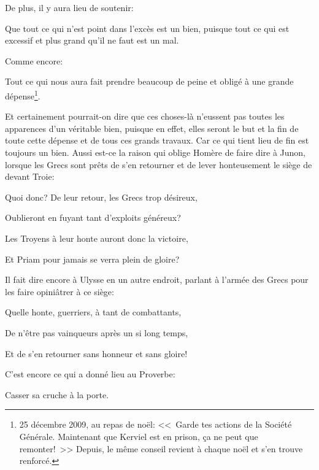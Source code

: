 \bigbreak

De plus, il y aura lieu de soutenir:

\begin{emphpar}
      Que tout ce qui n'est point dans l’excès est un bien, puisque tout ce qui est excessif et plus grand qu'il ne
	  faut est un mal.
\end{emphpar}

\bigbreak

Comme encore:

\begin{emphpar}
      Tout ce qui nous aura fait prendre beaucoup de peine et obligé à une grande dépense\footnote{25 décembre 2009,
	  au repas de noël: <<~Garde tes actions de la Société Générale. Maintenant que Kerviel est en prison, ça ne peut
	  que remonter!~>> Depuis, le même conseil revient à chaque noël et s'en trouve renforcé.}.
\end{emphpar}

Et certainement pourrait-on dire que ces choses-là n'eussent pas toutes les apparences d'un véritable bien, puisque en
effet, elles seront le but et la fin de toute cette dépense et de tous ces grands travaux. Car ce qui tient lieu de fin
est toujours un bien. Aussi est-ce la raison qui oblige Homère de faire dire à Junon, lorsque les Grecs sont prêts de s'en
retourner et de lever honteusement le siège de devant Troie:

\begin{emphpar}
      Quoi donc? De leur retour, les Grecs trop désireux,
	  
	  Oublieront en fuyant tant d'exploits généreux?

	  Les Troyens à leur honte auront donc la victoire,
	  
	  Et Priam pour jamais se verra plein de gloire?
\end{emphpar}

Il fait dire encore à Ulysse en un autre endroit, parlant à l'armée des Grecs pour les faire opiniâtrer à ce siège:

\begin{emphpar}
      Quelle honte, guerriers, à tant de combattants,

	  De n'être pas vainqueurs après un si long temps,
	  
	  Et de s'en retourner sans honneur et sans gloire!
\end{emphpar}

C'est encore ce qui a donné lieu au Proverbe:

\begin{emphpar}
	   Casser sa cruche à la porte. 
\end{emphpar}

